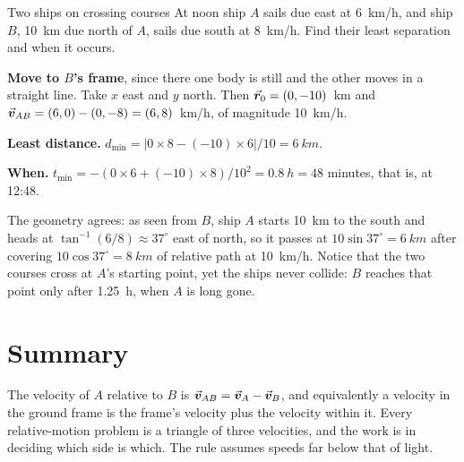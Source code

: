 \begin{exbox}{Two ships on crossing courses}
At noon ship $A$ sails due east at \SI{6}{km/h}, and ship $B$, \SI{10}{km} due north of $A$, sails due
south at \SI{8}{km/h}. Find their least separation and when it occurs.

 \textbf{Move to $B$'s frame}, since there one body is still and the other moves in a straight
line. Take $x$ east and $y$ north. Then $\vec{\bm{r}}_0=(0,-10)$~\si{km} and
$\vec{\bm{v}}_{AB}=(6,0)-(0,-8)=(6,8)$~\si{km/h}, of magnitude \SI{10}{km/h}.

 \textbf{Least distance.} $d_{\min}=|0\times8-(-10)\times6|/10=\SI{6}{km}$.

 \textbf{When.} $t_{\min}=-(0\times6+(-10)\times8)/10^2=\SI{0.8}{h}=48$ minutes, that is, at
12:48.

The geometry agrees: as seen from $B$, ship $A$ starts \SI{10}{km} to the south and heads at
$\tan^{-1}(6/8)\approx37^\circ$ east of north, so it passes at $10\sin37^\circ=\SI{6}{km}$ after covering
$10\cos37^\circ=\SI{8}{km}$ of relative path at \SI{10}{km/h}. Notice that the two courses cross at
$A$'s starting point, yet the ships never collide: $B$ reaches that point only after \SI{1.25}{h}, when
$A$ is long gone.
\end{exbox}

\section{Summary}\label{sec:summary5}
The velocity of $A$ relative to $B$ is $\vec{\bm{v}}_{AB}=\vec{\bm{v}}_A-\vec{\bm{v}}_B$, and equivalently a velocity in the
ground frame is the frame's velocity plus the velocity within it. Every relative-motion problem is a
triangle of three velocities, and the work is in deciding which side is which. The rule assumes
speeds far below that of light.

